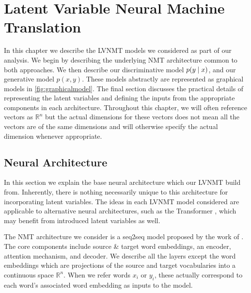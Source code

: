 \chapter{Latent Variable Neural Machine Translation}

In this chapter we describe the \ac{LVNMT} models we considered as part of our analysis. We begin by describing the underlying \ac{NMT} architecture common to both approaches. We then describe our discriminative model $p(y \; | \;{x})$, and our generative model $p(x, y)$. These models abstractly are represented as graphical models in \ref{fig:graphicalmodel}. The final section discusses the practical details of representing the latent variables and defining the inputs from the appropriate components in each architecture. Throughout this chapter, we will often reference vectors as $\mathbb{R}^{n}$ but the actual dimensions for these vectors does not mean all the vectors are of the same dimensions and will otherwise specify the actual dimension whenever appropriate. 


\section{Neural Architecture}

In this section we explain the base neural architecture which our \ac{LVNMT} build from. Inherently, there is nothing necessarily unique to this architecture for incorporating latent variables.  The ideas in each \ac{LVNMT} model considered are applicable to alternative neural architectures, such as the Transformer \cite{vaswani2017attentionTransformer}, which may benefit from introduced latent variables as well. 

The \ac{NMT} architecture we consider is a \ac{seq2seq} model proposed by the work of  \citet{bahdanau2014NMTBYJoint}. The core components include source \& target word embeddings, an encoder, attention mechanism, and decoder. We describe all the layers except the word embeddings which are projections of the source and target vocabularies into a continuous space $\mathbb{R}^{n}$. When we refer words $x_{i}$ or $y_{i}$, these actually correspond to each word's associated word embedding as inputs to the model.  


